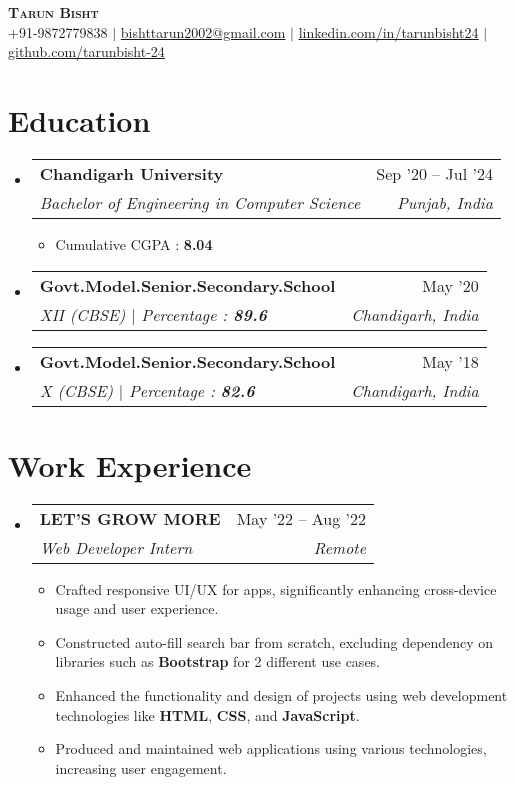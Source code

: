 \documentclass[letterpaper,11pt]{article}
\makeatletter
\newcommand{\resumeItem}[1]{
  \item\small{
    {#1 \vspace{-2pt}}
  }
}
\newcommand{\resumeSubheading}[4]{
  \vspace{-2pt}\item
    \begin{tabular*}{0.97\textwidth}[t]{l@{\extracolsep{\fill}}r}
      \textbf{#1} & #2 \\
      \textit{\small#3} & \textit{\small #4} \\
    \end{tabular*}\vspace{-7pt}
}
\newcommand{\resumeSubHeadingListStart}{\begin{itemize}[leftmargin=0.15in, label={}]}
\newcommand{\resumeSubHeadingListEnd}{\end{itemize}}
\newcommand{\resumeItemListStart}{\begin{itemize}}
\newcommand{\resumeItemListEnd}{\end{itemize}\vspace{-5pt}}
\makeatother
\begin{document}
\begin{center}
    \textbf{\Huge \scshape Tarun Bisht} \\ \vspace{1pt}
    \small +91-9872779838 $|$ \href{mailto:bishttarun2002@gmail.com}{bishttarun2002@gmail.com} $|$ 
    \href{https://www.linkedin.com/in/tarunbisht24/}{{\underline{linkedin.com/in/tarunbisht24}}} $|$
    \href{https://github.com/tarunbisht-24}{\underline{github.com/tarunbisht-24}}
\end{center}


\section{Education}
  \resumeSubHeadingListStart
    \resumeSubheading
      {Chandigarh University}{Sep '20 -- Jul '24}
      {Bachelor of Engineering in Computer Science}{Punjab, India}
      \resumeItemListStart
        \resumeItem{Cumulative CGPA : \textbf{8.04}}
      \resumeItemListEnd
    \resumeSubheading
      {Govt.Model.Senior.Secondary.School}{May '20}
      {XII (CBSE) $|$ Percentage : \textbf{89.6}}{Chandigarh, India}
    \resumeSubheading
      {Govt.Model.Senior.Secondary.School}{May '18}
      {X (CBSE) $|$ Percentage : \textbf{82.6}}{Chandigarh, India}
  \resumeSubHeadingListEnd

\section{Work Experience}
  \resumeSubHeadingListStart
    \resumeSubheading
      {LET'S GROW MORE}{May '22 -- Aug '22}
      {Web Developer Intern}{Remote}
          \resumeItemListStart
            \resumeItem{Crafted responsive UI/UX for apps, significantly enhancing cross-device usage and user experience.}
            \resumeItem{Constructed auto-fill search bar from scratch, excluding dependency on libraries such as \textbf{Bootstrap} for 2 different
            use cases.}
            \resumeItem{Enhanced the functionality and design of projects using web development technologies like \textbf{HTML}, \textbf{CSS}, and \textbf{JavaScript}.}
             \resumeItem{Produced and maintained web applications using various technologies, increasing user engagement.}
          \resumeItemListEnd
    \resumeSubHeadingListEnd
\end{document}
